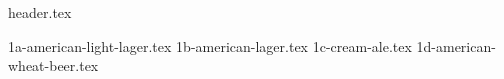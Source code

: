 \clearpage
{}
\divisorLine

{header.tex}

\begin{multicols}{2}

{1a-american-light-lager.tex}
{1b-american-lager.tex}
{1c-cream-ale.tex}
{1d-american-wheat-beer.tex}

\end{multicols}